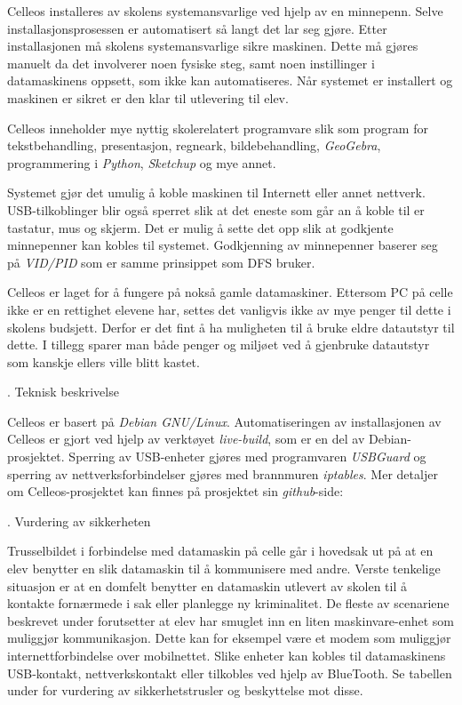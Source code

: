 Celleos installeres av skolens systemansvarlige ved hjelp av en minnepenn. Selve installasjonsprosessen er automatisert s\aa{} langt det lar seg gj\o re. Etter installasjonen m\aa{} skolens systemansvarlige sikre maskinen. Dette m\aa{} gj\o res manuelt da det involverer noen fysiske steg, samt noen instillinger i datamaskinens oppsett, som ikke kan automatiseres. N\aa r systemet er installert og maskinen er sikret er den klar til utlevering til elev.

Celleos inneholder mye nyttig skolerelatert programvare slik som program for tekstbehandling, presentasjon, regneark, bildebehandling, {\it GeoGebra}, programmering i {\it Python}, {\it Sketchup} og mye annet.

Systemet gj\o r det umulig \aa{} koble maskinen til Internett eller annet nettverk. USB-tilkoblinger blir ogs\aa{} sperret slik at det eneste som g\aa r an \aa{} koble til er tastatur, mus og skjerm. Det er mulig \aa{} sette det opp slik at godkjente minnepenner kan kobles til systemet. Godkjenning av minnepenner baserer seg p\aa{} {\it VID/PID} som er samme prinsippet som DFS bruker.

Celleos er laget for \aa{} fungere p\aa{} noks\aa{} gamle datamaskiner. Ettersom PC p\aa{} celle ikke er en rettighet elevene har, settes det vanligvis ikke av mye penger til dette i skolens budsjett. Derfor er det fint \aa{} ha muligheten til \aa{} bruke eldre datautstyr til dette. I tillegg sparer man b\aa de penger og milj\o et ved \aa{} gjenbruke datautstyr som kanskje ellers ville blitt kastet.

. Teknisk beskrivelse

Celleos er basert p\aa{} {\it Debian GNU/Linux}. Automatiseringen av installasjonen av Celleos er gjort ved hjelp av verkt\o yet {\it live-build}, som er en del av Debian-prosjektet. Sperring av USB-enheter gj\o res med programvaren {\it USBGuard} og sperring av nettverksforbindelser gj\o res med brannmuren {\it iptables}. Mer detaljer om Celleos-prosjektet kan finnes p\aa{} prosjektet sin {\it github}-side:
\vskip 8pt

. Vurdering av sikkerheten

Trusselbildet i forbindelse med datamaskin p\aa{} celle g\aa r i hovedsak ut p\aa{} at en elev benytter en slik datamaskin til \aa{} kommunisere med andre. Verste tenkelige situasjon er at en domfelt benytter en datamaskin utlevert av skolen til \aa{} kontakte forn\ae rmede i sak eller planlegge ny kriminalitet.
De fleste av scenariene beskrevet under forutsetter at elev har smuglet inn en liten maskinvare-enhet som muliggj\o r kommunikasjon. Dette kan for eksempel v\ae re et modem som muliggj\o r internettforbindelse over mobilnettet. Slike enheter kan kobles til datamaskinens USB-kontakt, nettverkskontakt eller tilkobles ved hjelp av BlueTooth.
Se tabellen under for vurdering av sikkerhetstrusler og beskyttelse mot disse.

